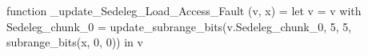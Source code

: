 function _update_Sedeleg_Load_Access_Fault (v, x) = let v = { v with Sedeleg_chunk_0 = update_subrange_bits(v.Sedeleg_chunk_0, 5, 5, subrange_bits(x, 0, 0)) } in
  v
